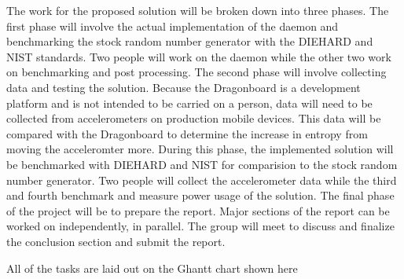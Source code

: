 
The work for the proposed solution will be broken down into three phases.  The first phase will involve the actual implementation of the daemon and benchmarking the stock random number generator with the DIEHARD and NIST standards.  Two people will work on the daemon while the other two work on benchmarking and post processing.  The second phase will involve collecting data and testing the solution.  Because the Dragonboard is a development platform and is not intended to be carried on a person, data will need to be collected from accelerometers on production mobile devices.  This data will be compared with the Dragonboard to determine the increase in entropy from moving the acceleromter more.  During this phase, the implemented solution will be benchmarked with DIEHARD and NIST for comparision to the stock random number generator.  Two people will collect the accelerometer data while the third and fourth benchmark and measure power usage of the solution.  The final phase of the project will be to prepare the report.  Major sections of the report can be worked on independently, in parallel.  The group will meet to discuss and finalize the conclusion section and submit the report.  

All of the tasks are laid out on the Ghantt chart shown here 
